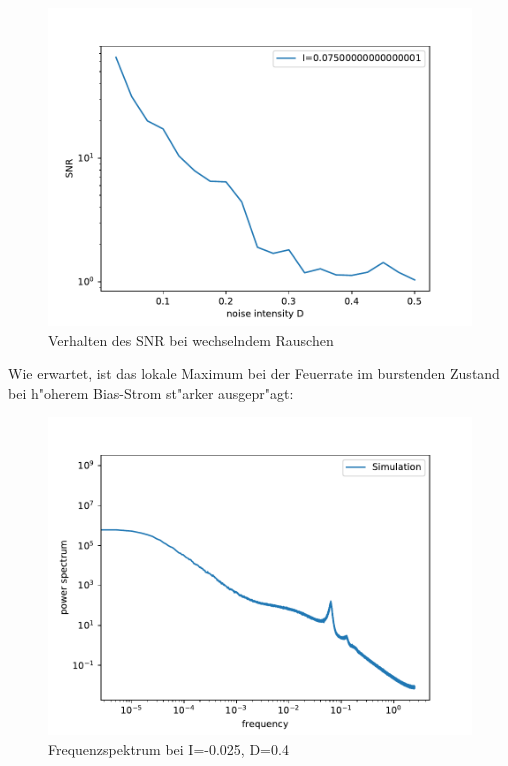 \documentclass[12pt,a4paper]{article}
\begin{document}
\begin{figure}[H]
	\centering
	\includegraphics[scale=0.9]{snrdrange.pdf}
	\caption{Verhalten des SNR bei wechselndem Rauschen}
	\label{snrdrange}
\end{figure}
Wie erwartet, ist das lokale Maximum bei der Feuerrate im burstenden Zustand bei h"oherem Bias-Strom st"arker ausgepr"agt:
\begin{figure}[H]
	\centering
	\includegraphics[scale=0.9]{inapikrealfast3jjem3407.pdf}
	\caption{Frequenzspektrum bei I=-0.025, D=0.4}
	\label{sp407}
\end{figure}
\end{document}
